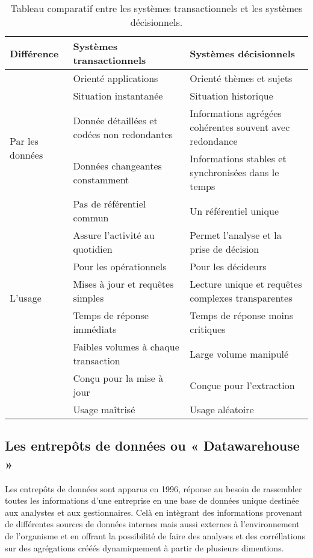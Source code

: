\begin{table}[H]
    \centering
    \caption{Tableau comparatif entre les systèmes transactionnels et les systèmes décisionnels.}
    \begin{tabular}[t]{|p{3cm}|p{6cm}|p{6cm}|} 
        \hline
        \textbf{Différence} & \textbf{Systèmes transactionnels} & \textbf{Systèmes décisionnels} \\
        \hline\hline
        \multirow{5}{5em}{Par les données} & Orienté applications & Orienté thèmes et sujets \\
        & Situation instantanée & Situation historique \\ 
        & Donnée détaillées et codées non redondantes & Informations agrégées cohérentes souvent avec redondance \\ 
        & Données changeantes constamment & Informations stables et synchronisées dans le temps \\ 
        & Pas de référentiel commun & Un référentiel unique \\ 
        \hline
        \multirow{5}{5em}{L’usage} & Assure l’activité au quotidien & Permet l’analyse et la prise de décision \\
        & Pour les opérationnels & Pour les décideurs \\ 
        & Mises à jour et requêtes simples & Lecture unique et requêtes complexes
        transparentes \\ 
        & Temps de réponse immédiats & Temps de réponse moins critiques \\ 
        & Faibles volumes à chaque transaction & Large volume manipulé \\ 
        & Conçu pour la mise à jour & Conçue pour l’extraction \\ 
        & Usage maîtrisé & Usage aléatoire \\ 
        \hline\hline
    \end{tabular}
    \label{tab:comparatifdecisonneltransactionnel}
\end{table}%


\subsection{Les entrepôts de données ou « Datawarehouse »}

Les entrepôts de données sont apparus en 1996, réponse au besoin de rassembler toutes les informations d’une entreprise en une base de données unique destinée aux analystes et aux gestionnaires. Celà en intègrant des informations provenant de différentes sources de données internes mais aussi externes à l’environnement de l’organisme et en offrant la possibilité de faire des analyses et des corréllations sur des agrégations crééés dynamiquement à partir de plusieurs dimentions.
